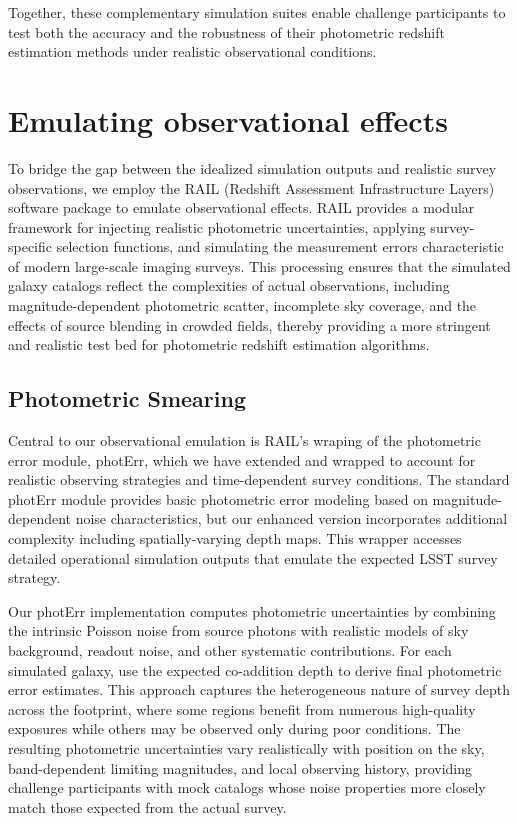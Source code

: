 \documentclass[modern]{desc-tex/styles/lsstdescnote}
\begin{document}
Together, these complementary simulation suites enable challenge
participants to test both the accuracy and the robustness of their
photometric redshift estimation methods under realistic observational
conditions.

\section{Emulating observational effects}

To bridge the gap between the idealized simulation outputs and
realistic survey observations, we employ the RAIL (Redshift Assessment
Infrastructure Layers) software package to emulate observational
effects. RAIL provides a modular framework for injecting realistic
photometric uncertainties, applying survey-specific selection
functions, and simulating the measurement errors characteristic of
modern large-scale imaging surveys. This processing ensures that the
simulated galaxy catalogs reflect the complexities of actual
observations, including magnitude-dependent photometric scatter,
incomplete sky coverage, and the effects of source blending in crowded
fields, thereby providing a more stringent and realistic test bed for
photometric redshift estimation algorithms.

\subsection{Photometric Smearing}

Central to our observational emulation is RAIL's wraping of the
photometric error module, photErr, which we have extended and wrapped
to account for realistic observing strategies and time-dependent
survey conditions. The standard photErr module provides basic
photometric error modeling based on magnitude-dependent noise
characteristics, but our enhanced version incorporates additional
complexity including spatially-varying depth maps. This
wrapper accesses detailed operational simulation outputs that emulate
the expected LSST survey strategy.

Our photErr implementation computes photometric uncertainties by
combining the intrinsic Poisson noise from source photons with
realistic models of sky background, readout noise, and other
systematic contributions.  For each simulated galaxy, use the expected
co-addition depth to derive final photometric error estimates. This
approach captures the heterogeneous nature of survey depth across the
footprint, where some regions benefit from numerous high-quality
exposures while others may be observed only during poor
conditions. The resulting photometric uncertainties vary realistically
with position on the sky, band-dependent limiting magnitudes, and
local observing history, providing challenge participants with mock
catalogs whose noise properties more closely match those expected from
the actual survey.
\end{document}
